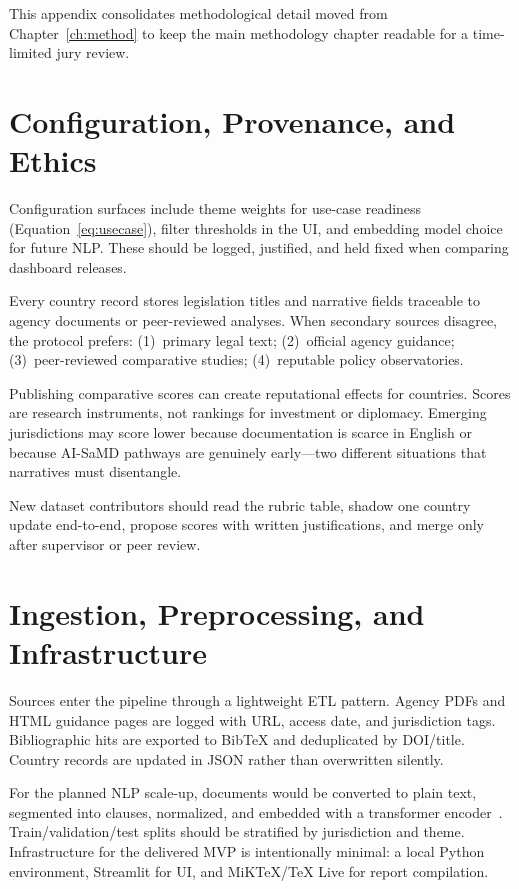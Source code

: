 This appendix consolidates methodological detail moved from Chapter~\ref{ch:method}
to keep the main methodology chapter readable for a time-limited jury review.

\section{Configuration, Provenance, and Ethics}
\label{sec:app-method-config}

Configuration surfaces include theme weights for use-case readiness
(Equation~\eqref{eq:usecase}), filter thresholds in the UI, and embedding model
choice for future NLP. These should be logged, justified, and held fixed when
comparing dashboard releases.

Every country record stores legislation titles and narrative fields traceable to
agency documents or peer-reviewed analyses. When secondary sources disagree, the
protocol prefers: (1)~primary legal text; (2)~official agency guidance;
(3)~peer-reviewed comparative studies; (4)~reputable policy observatories.

Publishing comparative scores can create reputational effects for countries.
Scores are research instruments, not rankings for investment or diplomacy.
Emerging jurisdictions may score lower because documentation is scarce in English
or because AI-SaMD pathways are genuinely early---two different situations that
narratives must disentangle.

New dataset contributors should read the rubric table, shadow one country update
end-to-end, propose scores with written justifications, and merge only after
supervisor or peer review.

\section{Ingestion, Preprocessing, and Infrastructure}
\label{sec:app-method-ingest}

Sources enter the pipeline through a lightweight ETL pattern. Agency PDFs and HTML
guidance pages are logged with URL, access date, and jurisdiction tags.
Bibliographic hits are exported to BibTeX and deduplicated by DOI/title. Country
records are updated in JSON rather than overwritten silently.

For the planned NLP scale-up, documents would be converted to plain text,
segmented into clauses, normalized, and embedded with a transformer
encoder~\cite{vaswani2017,devlin2019,beltagy2019}. Train/validation/test splits
should be stratified by jurisdiction and theme. Infrastructure for the delivered
MVP is intentionally minimal: a local Python environment, Streamlit for UI, and
MiKTeX/TeX Live for report compilation.


